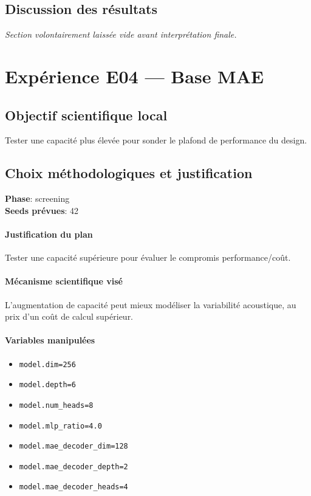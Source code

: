 \documentclass[11pt,a4paper]{article}
\begin{document}
\subsection{Discussion des résultats}
\textit{Section volontairement laissée vide avant interprétation finale.}


\section{Expérience E04 --- Base MAE}
\subsection{Objectif scientifique local}
Tester une capacité plus élevée pour sonder le plafond de performance du design.

\subsection{Choix méthodologiques et justification}
\textbf{Phase}: screening\\
\textbf{Seeds prévues}: 42\\


\paragraph{Justification du plan}
Tester une capacité supérieure pour évaluer le compromis performance/coût.

\paragraph{Mécanisme scientifique visé}
L'augmentation de capacité peut mieux modéliser la variabilité acoustique, au prix d'un coût de calcul supérieur.

\paragraph{Variables manipulées}
\begin{itemize}
\item \texttt{model.dim=256}
\item \texttt{model.depth=6}
\item \texttt{model.num\_heads=8}
\item \texttt{model.mlp\_ratio=4.0}
\item \texttt{model.mae\_decoder\_dim=128}
\item \texttt{model.mae\_decoder\_depth=2}
\item \texttt{model.mae\_decoder\_heads=4}
\end{itemize}
\end{document}

